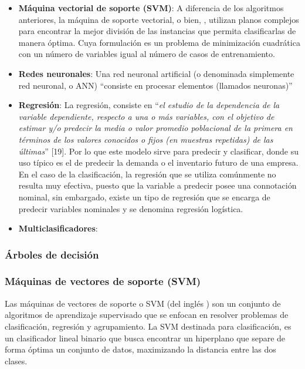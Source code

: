 \begin{itemize}
\item \textbf{Máquina vectorial de soporte (SVM)}: A diferencia de los algoritmos anteriores, la máquina de soporte vectorial, o bien, , utilizan planos complejos para encontrar la mejor división de las instancias que permita clasificarlas de manera óptima. Cuya formulación es un problema de minimización cuadrática con un número de variables igual al número de casos de entrenamiento.

\item \textbf{Redes neuronales}: Una red neuronal artificial (o denominada simplemente red neuronal, o ANN) ``consiste en procesar elementos (llamados neuronas)''

\item \textbf{Regresión}: La regresión, consiste en ``\textit{el estudio de la dependencia de la variable dependiente, respecto a una o más variables, con el objetivo de estimar y/o predecir la media o valor promedio poblacional de la primera en términos de los valores conocidos o fijos (en muestras repetidas) de las últimas}'' [19]. Por lo que este modelo sirve para predecir y clasificar, donde su uso típico es el de predecir la demanda o el inventario futuro de una empresa. En el caso de la clasificación, la regresión que se utiliza comúnmente no resulta muy efectiva, puesto que la variable a predecir posee una connotación nominal, sin embargado, existe un tipo de regresión que se encarga de predecir variables nominales y se denomina regresión logística.


\item \textbf{Multiclasificadores}:
\end{itemize}

\subsubsection*{Árboles de decisión}

\begin{figure}[H]
	\centering
	
	\label{fig:decision-tree}
\end{figure}


\subsubsection*{Máquinas de vectores de soporte (SVM)}
Las máquinas de vectores de soporte o SVM (del inglés ) son un conjunto de algoritmos de aprendizaje supervisado que se enfocan en resolver problemas de clasificación, regresión y agrupamiento. La SVM destinada para clasificación, es un clasificador lineal binario que busca encontrar un hiperplano que separe de forma óptima un conjunto de datos, maximizando la distancia entre las dos clases.


